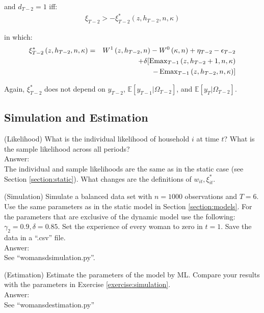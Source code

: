 \noindent and $d_{T-2} = 1$ iff:
\begin{eqnarray*}
\xi_{T-2} > -\xi^*_{T-2} \left(z, h_{T-2}, n, \kappa \right)
\end{eqnarray*}

\noindent in which:
\begin{eqnarray*}
\xi^*_{T-2} \left(z, h_{T-2}, n, \kappa \right) &=& W^1\left( z, h_{T-2}, n\right) - W^0\left( \kappa, n\right) + \eta_{T-2} - \epsilon_{T-2}\\
& & + \delta [ \operatorname{Emax}_{T-1} \left( z, h_{T-2}+1, n, \kappa \right) \\
& & - \operatorname{Emax}_{T-1} \left(z, h_{T-2}, n, \kappa \right)]
\end{eqnarray*}

\noindent Again, $\xi_{T-2}^*$ does not depend on $y_{T-2}$, $\mathbb{E} [y_{T-1} | \Omega_{T-2}]$, and $\mathbb{E} [y_T | \Omega_{T-2}]$.

\subsection{Simulation and Estimation}

\begin{exercise} (Likelihood)
What is the individual likelihood of household $i$ at time $t$? What is the sample likelihood across all periods?\\
\noindent Answer:\\
\noindent The individual and sample likelihoods are the same as in the static case (see Section \ref{section:static}). What changes are the definitions of $w_{it}, \xi_{it}^*$.
\end{exercise}

\begin{exercise} (Simulation) \label{exercise:simulation}
Simulate a balanced data set with $n = 1000$ observations and $T=6$. Use the same parameters as in the static model in Section \ref{section:models}. For the parameters that are exclusive of the dynamic model use the following: $\gamma_2 = 0.9,\delta = 0.85$. Set the experience of every woman to zero in $t=1$. Save the data in a ``.csv'' file.\\
\noindent Answer:\\
See ``womansdsimulation.py''.
\end{exercise}

\begin{exercise} (Estimation)
Estimate the parameters of the model by ML. Compare your results with the parameters in Exercise \ref{exercise:simulation}.\\
\noindent Answer:\\
See ``womansdestimation.py''
\end{exercise}